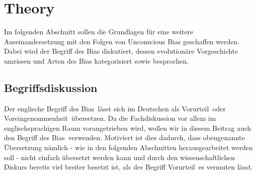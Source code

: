 \newpage
\section{Theory}
Im folgenden Abschnitt sollen die Grundlagen für eine weitere Auseinandersetzung mit den Folgen von Unconscious Bias geschaffen werden. Dabei wird der Begriff des Bias diskutiert, dessen evolutionäre Vorgeschichte umrissen und Arten des Bias kategorisiert sowie besprochen.\\

\subsection{Begriffsdiskussion}
Der englische Begriff des \glqq Bias\grqq~lässt sich im Deutschen als \glqq Vorurteil\grqq~oder \glqq Voreingenommenheit\grqq~übersetzen. Da die Fachdiskussion vor allem im englischsprachigen Raum vorangetrieben wird, wollen wir in diesem Beitrag auch den Begriff des \glqq Bias\grqq~verwenden. Motiviert ist dies dadurch, dass obengenannte Übersetzung nämlich - wie in den folgenden Abschnitten herausgearbeitet werden soll - nicht einfach übersetzt werden kann und durch den wissenschaftlichen Diskurs bereits viel breiter besetzt ist, als der Begriff \glqq Vorurteil\grqq~es vermuten lässt. \\
